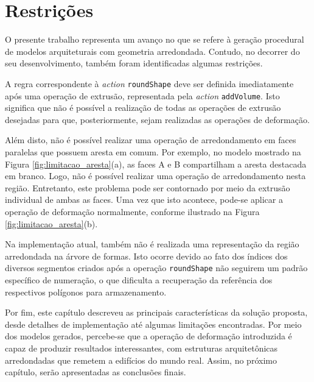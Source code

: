 \section{Restrições}
\label{sec:limitacoes}

O presente trabalho representa um avanço no que se refere à geração procedural de modelos arquiteturais com geometria arredondada. Contudo, no decorrer do seu desenvolvimento, também foram identificadas algumas restrições.

A regra correspondente à \textit{action} \texttt{roundShape} deve ser definida imediatamente após uma operação de extrusão, representada pela \textit{action} \texttt{addVolume}. Isto significa que não é possível a realização de todas as operações de extrusão desejadas para que, posteriormente, sejam realizadas as operações de deformação.

Além disto, não é possível realizar uma operação de arredondamento em faces paralelas que possuem aresta em comum. Por exemplo, no modelo mostrado na Figura \ref{fig:limitacao_aresta}(a), as faces A e B compartilham a aresta destacada em branco. Logo, não é possível realizar uma operação de arredondamento nesta região. Entretanto, este problema pode ser contornado por meio da extrusão individual de ambas as faces. Uma vez que isto acontece, pode-se aplicar a operação de deformação normalmente, conforme ilustrado na Figura \ref{fig:limitacao_aresta}(b).

\begin{figure}[h!]
	\centering
	\captionsetup{width=15cm}
	{}	
\end{figure}

Na implementação atual, também não é realizada uma representação da região arredondada na árvore de formas. Isto ocorre devido ao fato dos índices dos diversos segmentos criados após a operação \texttt{roundShape} não seguirem um padrão específico de numeração, o que dificulta a recuperação da referência dos respectivos polígonos para armazenamento.

\vspace{1cm}

Por fim, este capítulo descreveu as principais características da solução proposta, desde detalhes de implementação até algumas limitações encontradas. Por meio dos modelos gerados, percebe-se que a operação de deformação introduzida é capaz de produzir resultados interessantes, com estruturas arquitetônicas arredondadas que remetem a edifícios do mundo real. Assim, no próximo capítulo, serão apresentadas as conclusões finais.